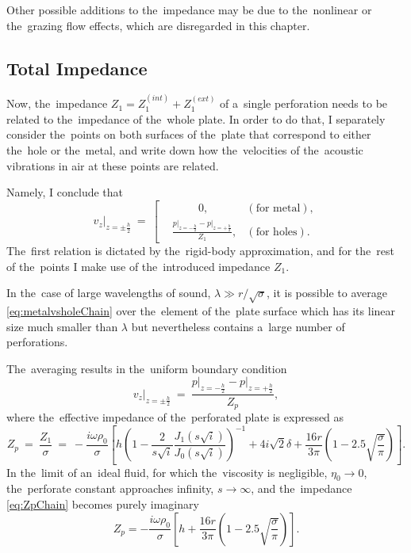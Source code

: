 Other possible additions to the~impedance may be due to the~nonlinear or the~grazing flow effects, which are disregarded in this chapter.


\subsection{Total Impedance}

Now, the~impedance $Z_1 = Z_1^{(int)}+Z_1^{(ext)}$ of a~single perforation needs to be related to the~impedance of the~whole plate.
In order to do that, I separately consider the~points on both surfaces of the~plate that correspond to either the~hole or the~metal, and write down how the~velocities of the~acoustic vibrations in air at these points are related.

Namely, I conclude that
\begin{equation}
\label{eq:metalvsholeChain}
\left.v_z\right|_{z=\pm\frac{h}{2}}~=~
\left[\begin{aligned}
&\hspace{1cm} 0, &(\text{for metal}), \\
&\frac{\left.p\right|_{z=-\frac{h}{2}}-\left.p\right|_{z=+\frac{h}{2}}}{Z_1}, &(\text{for holes}).
\end{aligned}\right.
\end{equation}
The~first relation is dictated by the~rigid-body approximation, and for the~rest of the~points I make use of the~introduced impedance $Z_1$.

In the~case of large wavelengths of sound, $\lambda \gg r/\sqrt{\sigma}$, it is possible to average \cref{eq:metalvsholeChain} over the~element of the~plate surface which has its linear size much smaller than $\lambda$ but nevertheless contains a~large number of perforations.

The~averaging results in the~uniform boundary condition
\begin{equation}
\label{eq:boundaryconditionChain}
\left.v_z\right|_{z=\pm\frac{h}{2}}~=~\frac{\left.p\right|_{z=-\frac{h}{2}}-\left.p\right|_{z=+\frac{h}{2}}}{Z_p},
\end{equation}
where the~effective impedance of the~perforated plate is expressed as
\begin{equation}
\label{eq:ZpChain}
Z_p~=~\frac{Z_1}{\sigma}~=~-\frac{i\omega\rho_0}{\sigma} \left[ h \left(1-\frac{2}{s\sqrt{i}}\frac{J_1\left(s\sqrt{i}\right)}{J_0\left(s\sqrt{i}\right)}\right)^{-1} + 4i\sqrt{2}\delta + \frac{16r}{3\pi}\left(1-2.5\sqrt{\frac{\sigma}{\pi}}\right) \right].
\end{equation}
In the~limit of an~ideal fluid, for which the~viscosity is negligible, $\eta_0 \rightarrow 0$, the~perforate constant approaches infinity, $s\rightarrow\infty$, and the~impedance \cref{eq:ZpChain} becomes purely imaginary
\begin{equation}
\label{eq:ZpIdealChain}
Z_p = -\dfrac{i\omega\rho_0 }{\sigma} \left[h + \dfrac{16r}{3\pi}\left(1-2.5\sqrt{\dfrac{\sigma}{\pi}}\right)\right].
\end{equation}

